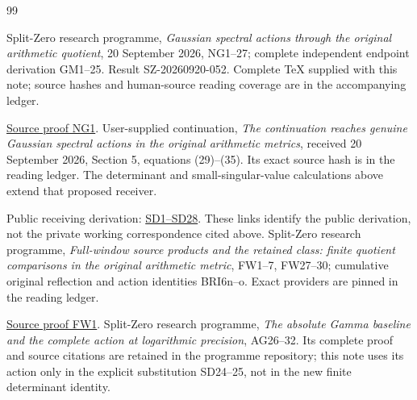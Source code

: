 \documentclass[11pt]{article}
\begin{document}
\clearpage
\begin{thebibliography}{99}

 Split-Zero research programme, \emph{Gaussian spectral
actions through the original arithmetic quotient}, 20 September 2026,
NG1--27; complete independent endpoint derivation GM1--25. Result
SZ-20260920-052. Complete TeX supplied with this note; source hashes and
human-source reading coverage are in the accompanying ledger.

\href{https://github.com/KokunoYumeto/zeta-function-research-reader/blob/5992ad50c0f2a06921f1fcaded7b4e38097c0739/workbenches/splitzero-tandem/continuations/20260920-original-kernel-mixed-determinants/providers/GAUSSIAN_ARITHMETIC_RETURN.tex\#L31}{Source proof NG1}.
 User-supplied continuation, \emph{The continuation
reaches genuine Gaussian spectral actions in the original arithmetic
metrics}, received 20 September 2026, Section 5, equations (29)--(35).
Its exact source hash is in the reading ledger. The determinant and
small-singular-value calculations above extend that proposed receiver.

Public receiving derivation: \href{https://github.com/KokunoYumeto/zeta-function-research-reader/blob/689a8f87e9c12b7a99b01b3123438c6751ee608f/workbenches/splitzero-tandem/continuations/20260920-original-spectral-determinant/ORIGINAL_SPECTRAL_DETERMINANT.tex\#L34}{SD1--SD28}. These links identify the public derivation, not the private working correspondence cited above.
 Split-Zero research programme, \emph{Full-window source
products and the retained class: finite quotient comparisons in the
original arithmetic metric}, FW1--7, FW27--30; cumulative original
reflection and action identities BRI6n--o. Exact providers are pinned
in the reading ledger.

\href{https://github.com/KokunoYumeto/zeta-function-research-reader/blob/5992ad50c0f2a06921f1fcaded7b4e38097c0739/workbenches/splitzero-tandem/continuations/20260920-original-kernel-mixed-determinants/providers/FULL_WINDOW_SOURCE_PRODUCTS.tex\#L28}{Source proof FW1}.
 Split-Zero research programme, \emph{The absolute Gamma
baseline and the complete action at logarithmic precision}, AG26--32.
Its complete proof and source citations are retained in the programme
repository; this note uses its action only in the explicit substitution
SD24--25, not in the new finite determinant identity.


\end{thebibliography}
\end{document}
